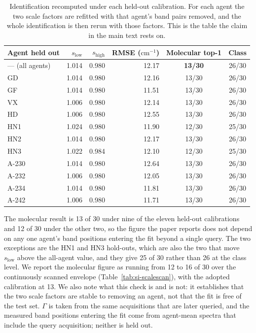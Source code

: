 \documentclass[11pt]{article}
\newcommand*\wn{\ensuremath{\text{cm}^{-1}}}
\begin{document}
\begin{table}[htbp]
\centering
\caption{Identification recomputed under each held-out calibration. For each agent the
two scale factors are refitted with that agent's band pairs removed, and the whole
identification is then rerun with those factors. This is the table the claim in the main
text rests on.}
\label{tab:si-loaoident}
\small
\begin{tabular}{lrrrcc}
\toprule
Agent held out & $s_\mathrm{low}$ & $s_\mathrm{high}$ & RMSE (\wn) & Molecular top-1 & Class \\
\midrule
--- (all agents) & 1.014 & 0.980 & 12.17 & \textbf{13/30} & 26/30 \\
\midrule
GD & 1.014 & 0.980 & 12.16 & 13/30 & 26/30 \\
GF & 1.014 & 0.980 & 11.51 & 13/30 & 26/30 \\
VX & 1.006 & 0.980 & 12.14 & 13/30 & 26/30 \\
HD & 1.006 & 0.980 & 12.55 & 13/30 & 26/30 \\
HN1 & 1.024 & 0.980 & 11.90 & 12/30 & 25/30 \\
HN2 & 1.014 & 0.980 & 12.17 & 13/30 & 26/30 \\
HN3 & 1.022 & 0.984 & 12.10 & 12/30 & 25/30 \\
A-230 & 1.014 & 0.980 & 12.64 & 13/30 & 26/30 \\
A-232 & 1.006 & 0.980 & 12.05 & 13/30 & 26/30 \\
A-234 & 1.014 & 0.980 & 11.81 & 13/30 & 26/30 \\
A-242 & 1.006 & 0.980 & 11.71 & 13/30 & 26/30 \\
\bottomrule
\end{tabular}

\begin{flushleft}\footnotesize The molecular result is 13 of 30 under nine of the eleven
held-out calibrations and 12 of 30 under the other two, so the figure the paper reports
does not depend on any one agent's band positions entering the fit beyond a single query.
The two exceptions are the HN1 and HN3 hold-outs, which are also the two that move
$s_\mathrm{low}$ above the all-agent value, and they give 25 of 30 rather than 26 at the class level. We
report the molecular figure as running from 12 to 16 of 30 over the continuously scanned
envelope (Table~\ref{tab:si-scalescan}), with the adopted calibration at 13. We also note
what this check is and is not: it establishes that the two scale factors are stable to
removing an agent, not that the fit is free of the test set. $\Gamma$ is taken from the
same acquisitions that are later queried, and the measured band positions entering the fit
come from agent-mean spectra that include the query acquisition; neither is held
out.\end{flushleft}
\end{table}
\end{document}
